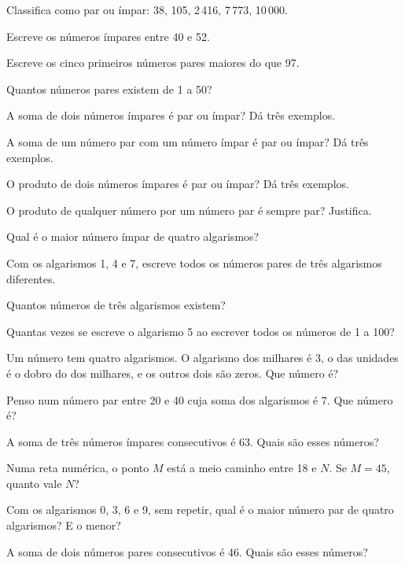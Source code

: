 \documentclass[12pt]{article}
\begin{document}
\begin{exercicios}
  \item Classifica como par ou ímpar: 38, 105, 2\,416, 7\,773, 10\,000.
  \item Escreve os números ímpares entre 40 e 52.
  \item Escreve os cinco primeiros números pares maiores do que 97.
  \item Quantos números pares existem de 1 a 50?
  \item A soma de dois números ímpares é par ou ímpar? Dá três exemplos.
  \item A soma de um número par com um número ímpar é par ou ímpar? Dá três exemplos.
  \item O produto de dois números ímpares é par ou ímpar? Dá três exemplos.
  \item O produto de qualquer número por um número par é sempre par? Justifica.
  \item Qual é o maior número ímpar de quatro algarismos?
  \item Com os algarismos 1, 4 e 7, escreve todos os números pares de três algarismos diferentes.
\end{exercicios}

\begin{exercicios}
  \item Quantos números de três algarismos existem?
  \item Quantas vezes se escreve o algarismo 5 ao escrever todos os números de 1 a 100?
  \item Um número tem quatro algarismos. O algarismo dos milhares é 3, o das unidades é o dobro do dos milhares, e os outros dois são zeros. Que número é?
  \item Penso num número par entre 20 e 40 cuja soma dos algarismos é 7. Que número é?
  \item A soma de três números ímpares consecutivos é 63. Quais são esses números?
  \item Numa reta numérica, o ponto $M$ está a meio caminho entre 18 e $N$. Se $M = 45$, quanto vale $N$?
  \item Com os algarismos 0, 3, 6 e 9, sem repetir, qual é o maior número par de quatro algarismos? E o menor?
  \item A soma de dois números pares consecutivos é 46. Quais são esses números?
\end{exercicios}
\end{document}

